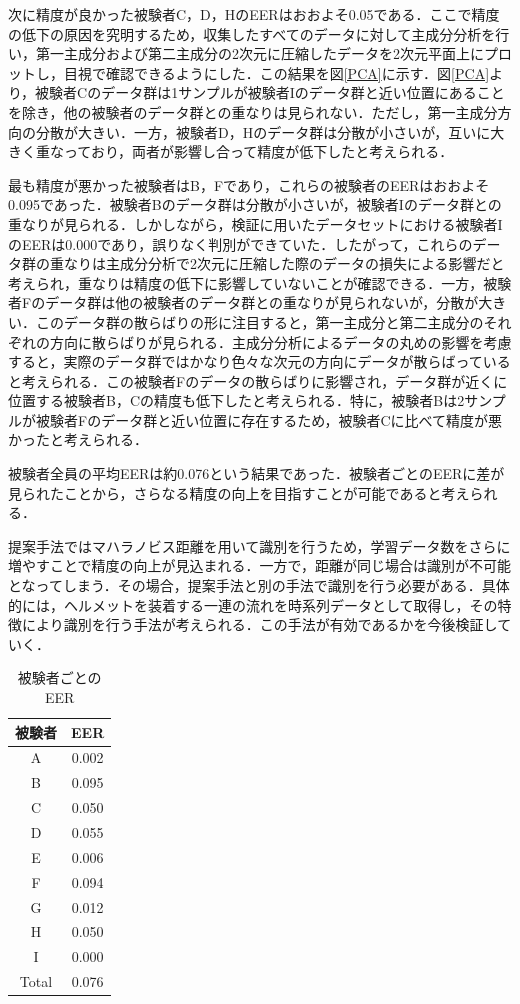 \documentclass[Japanese,noauthor]{dicomopapers}
\begin{document}
次に精度が良かった被験者C，D，HのEERはおおよそ0.05である．ここで精度の低下の原因を究明するため，収集したすべてのデータに対して主成分分析を行い，第一主成分および第二主成分の2次元に圧縮したデータを2次元平面上にプロットし，目視で確認できるようにした．この結果を図\ref{PCA}に示す．図\ref{PCA}より，被験者Cのデータ群は1サンプルが被験者Iのデータ群と近い位置にあることを除き，他の被験者のデータ群との重なりは見られない．ただし，第一主成分方向の分散が大きい．一方，被験者D，Hのデータ群は分散が小さいが，互いに大きく重なっており，両者が影響し合って精度が低下したと考えられる．\par

最も精度が悪かった被験者はB，Fであり，これらの被験者のEERはおおよそ0.095であった．被験者Bのデータ群は分散が小さいが，被験者Iのデータ群との重なりが見られる．しかしながら，検証に用いたデータセットにおける被験者IのEERは0.000であり，誤りなく判別ができていた．したがって，これらのデータ群の重なりは主成分分析で2次元に圧縮した際のデータの損失による影響だと考えられ，重なりは精度の低下に影響していないことが確認できる．一方，被験者Fのデータ群は他の被験者のデータ群との重なりが見られないが，分散が大きい．このデータ群の散らばりの形に注目すると，第一主成分と第二主成分のそれぞれの方向に散らばりが見られる．主成分分析によるデータの丸めの影響を考慮すると，実際のデータ群ではかなり色々な次元の方向にデータが散らばっていると考えられる．この被験者Fのデータの散らばりに影響され，データ群が近くに位置する被験者B，Cの精度も低下したと考えられる．特に，被験者Bは2サンプルが被験者Fのデータ群と近い位置に存在するため，被験者Cに比べて精度が悪かったと考えられる．\par

被験者全員の平均EERは約0.076という結果であった．被験者ごとのEERに差が見られたことから，さらなる精度の向上を目指すことが可能であると考えられる．\par

提案手法ではマハラノビス距離を用いて識別を行うため，学習データ数をさらに増やすことで精度の向上が見込まれる．一方で，距離が同じ場合は識別が不可能となってしまう．その場合，提案手法と別の手法で識別を行う必要がある．具体的には，ヘルメットを装着する一連の流れを時系列データとして取得し，その特徴により識別を行う手法が考えられる．この手法が有効であるかを今後検証していく．

\begin{table}[!t]
  \centering
  \caption{被験者ごとのEER}
  \begin{tabular}{c|c} \hline\hline
    被験者 & EER \\ \hline
    A & 0.002 \\
    B & 0.095 \\
    C & 0.050 \\
    D & 0.055 \\
    E & 0.006 \\
    F & 0.094 \\
    G & 0.012 \\
    H & 0.050 \\
    I & 0.000 \\ \hline
    Total & 0.076 \\ \hline
  \end{tabular}
  \label{EER_num}
\end{table}
\end{document}
